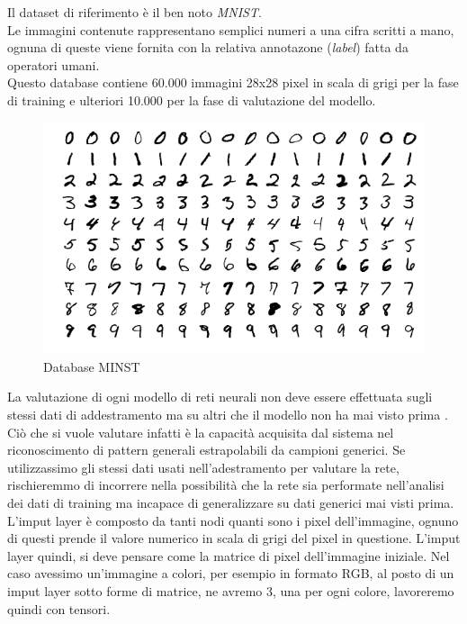 \documentclass[12pt,a4paper,openright,twoside]{report}
\begin{document}
Il dataset di riferimento è il ben noto \emph{MNIST}.\\
Le immagini contenute rappresentano semplici numeri a una cifra scritti a mano, ognuna di queste viene fornita con la relativa annotazone (\emph{label}) fatta da operatori umani.\\
Questo database contiene 60.000 immagini 28x28 pixel in scala di grigi per la fase di training e ulteriori 10.000 per la fase di valutazione del modello. \\
\begin{figure}[h]
\centering
\includegraphics[width=\linewidth]{minst.png}
\caption{Database MINST}
\end{figure}
La valutazione di ogni modello di reti neurali non deve essere effettuata sugli stessi dati di addestramento ma su altri che il modello non ha mai visto prima . Ciò che si vuole valutare infatti è la capacità acquisita dal sistema nel riconoscimento di pattern generali estrapolabili da campioni generici. Se utilizzassimo gli stessi dati usati nell'adestramento per valutare la rete, rischieremmo di incorrere nella possibilità che la rete sia performate nell'analisi dei dati di training ma incapace di generalizzare su dati generici mai visti prima.   \\
\newpage
L'imput layer è composto da tanti nodi quanti sono i pixel dell'immagine, ognuno di questi prende il valore numerico in scala di grigi del pixel in questione.
L'imput layer quindi, si deve pensare come la matrice di pixel dell'immagine iniziale. Nel caso avessimo un'immagine a colori, per esempio in formato RGB, al posto di un imput layer sotto forme di matrice, ne avremo 3, una per ogni colore, lavoreremo quindi con tensori.\\
\newpage
\end{document}
